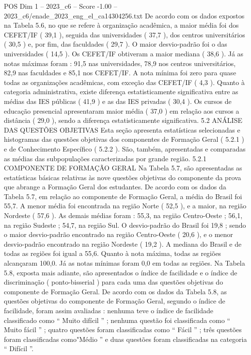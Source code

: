 \begin{textsample}{POS Dim 1 – 2023\_c6 – Score -1.00 – 2023\_c6/enade\_2023\_eng\_el\_ca14304256.txt}
De acordo com os dados expostos na Tabela 5.6, no que se refere à organização acadêmica, a maior média foi dos CEFET/IF ( 39,1 ), seguida das universidades ( 37,7 ), dos centros universitários ( 30,5 ) e, por fim, das faculdades ( 29,7 ).
O maior desvio-padrão foi o das universidades ( 14,5 ).
Os CEFET/IF obtiveram a maior mediana ( 38,6 ).
Já as notas máximas foram : 91,5 nas universidades, 78,9 nos centros universitários, 82,9 nas faculdades e 85,1 nos CEFET/IF.
A nota mínima foi zero para quase todas as organizações acadêmicas, com exceção das CEFET/IF ( 4,3 ).
Quanto à categoria administrativa, existe diferença estatisticamente significativa entre as médias das IES públicas ( 41,9 ) e as das IES privadas ( 30,4 ).
Os cursos de educação presencial apresentaram maior média ( 37,0 ) em relação aos cursos a distância ( 29,0 ), sendo a diferença estatisticamente significativa. 5.2 ANÁLISE DAS QUESTÕES OBJETIVAS Esta seção apresenta estatísticas selecionadas e histogramas das questões objetivas dos componentes de Formação Geral ( 5.2.1 ) e de Conhecimento Específico ( 5.2.2 ).
São, também, apresentadas e comparadas as médias das subpopulações caracterizadas por grande região. 5.2.1 COMPONENTE DE FORMAÇÃO GERAL Na Tabela 5.7, são apresentadas as estatísticas básicas relativas às nove questões objetivas do componente da prova que abrange a Formação Geral dos estudantes.
De acordo com os dados da Tabela 5.7, em relação ao componente de Formação Geral, a média do Brasil foi 55,7.
A menor média foi encontrada na região Norte ( 52,5 ), e a maior, na região Nordeste ( 57,6 ).
As demais médias foram : 55,3, na região Centro-Oeste ; 56,1, na região Sudeste ; 54,7, na região Sul.
O desvio-padrão do Brasil foi 19,8 ; sendo o maior desvio-padrão encontrado na região Centro-Oeste ( 20,6 ), e o menor desvio-padrão encontrado na região Nordeste ( 19,2 ).
A mediana do Brasil e de todas as regiões foi igual a 55,6.
Quanto à nota máxima, todas as regiões alcançaram 100,0.
Já as notas mínimas foram 0,0 em todas as regiões.
Na Tabela 5.8, exposta mais adiante, são apresentados o índice de facilidade e o índice de discriminação ( ponto-bisserial ) para cada uma das questões objetivas do componente de Formação Geral.
De acordo com os dados da Tabela 5.8, as questões objetivas do componente de Formação Geral, segundo o índice de facilidade, foram assim avaliadas : nenhuma teve o índice de facilidade classificado como “ Muito difícil ” ; nenhuma questão foi classificada como “ Muito fácil ” ; quatro questões foram classificadas como “ Fácil ” ; três questões foram classificadas como"Médio ” e duas questões foram classificadas na categoria “ Difícil ”.

\end{textsample}
